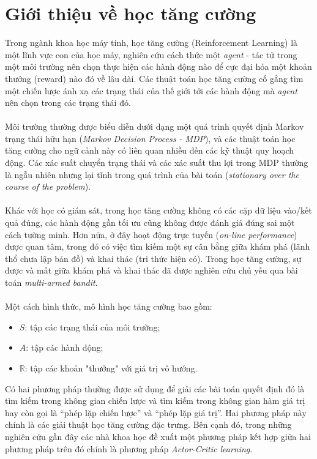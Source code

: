 \documentclass[12pt,a4paper]{report}
\begin{document}
\chapter{Giới thiệu về học tăng cường}
Trong ngành khoa học máy tính, học tăng cường (Reinforcement Learning) là một lĩnh vực con của học máy, nghiên cứu cách thức một \textit{agent} - tác tử trong một môi trường nên chọn thực hiện các hành động nào để cực đại hóa một khoản thưởng (reward) nào đó về lâu dài. Các thuật toán học tăng cường cố gắng tìm một chiến lược ánh xạ các trạng thái của thế giới tới các hành động mà \textit{agent} nên chọn trong các trạng thái đó.\\\\
Môi trường thường được biểu diễn dưới dạng một quá trình quyết định Markov trạng thái hữu hạn (\textit{Markov Decision Process - MDP}), và các thuật toán học tăng cường cho ngữ cảnh này có liên quan nhiều đến các kỹ thuật quy hoạch động. Các xác suất chuyển trạng thái và các xác suất thu lợi trong MDP thường là ngẫu nhiên nhưng lại tĩnh trong quá trình của bài toán (\textit{stationary over the course of the problem}). \\\\
Khác với học có giám sát, trong học tăng cường không có các cặp dữ liệu vào/kết quả đúng, các hành động gần tối ưu cũng không được đánh giá đúng sai một cách tường minh. Hơn nữa, ở đây hoạt động trực tuyến (\textit{on-line performance}) được quan tâm, trong đó có việc tìm kiếm một sự cân bằng giữa khám phá (lãnh thổ chưa lập bản đồ) và khai thác (tri thức hiện có). Trong học tăng cường, sự được và mất giữa khám phá và khai thác đã được nghiên cứu chủ yếu qua bài toán \textit{multi-armed bandit}.\\\\
Một cách hình thức, mô hình học tăng cường bao gồm:
\begin{itemize}
	\item $S$: tập các trạng thái của môi trường;
	\item $A$: tập các hành động;
	\item $\mathbb{R}$: tập các khoản "thưởng" với giá trị vô hướng.
\end{itemize}
Có hai phương pháp thường được sử dụng để giải các bài toán quyết định đó là tìm kiếm
trong không gian chiến lược và tìm kiếm trong không gian hàm giá trị hay còn gọi là “phép lặp
chiến lược” và “phép lặp giá trị”. Hai phương pháp này chính là các giải thuật học tăng cường
đặc trưng. Bên cạnh đó, trong những nghiên cứu gần đây các nhà khoa học đề xuất một phương
pháp kết hợp giữa hai phương pháp trên đó chính là phương pháp \textit{Actor-Critic learning}.\\\\
\end{document}
